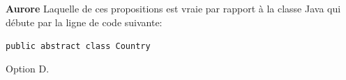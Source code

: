\begin{Exercice}[5 minutes]\textbf{Aurore}
Laquelle de ces propositions est vraie par rapport à la classe Java qui débute par la ligne de code suivante:

\lstinline[style=javastyle]{public abstract class Country}

\begin{solution}
Option D. 
\end{solution}

\end{Exercice}
